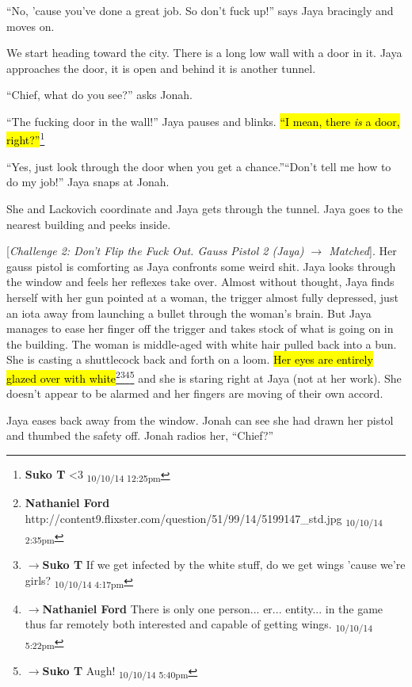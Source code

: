 ``No, 'cause you've done a great job.  So don't fuck up!'' says Jaya bracingly and moves on.





We start heading toward the city.  There is a long low wall with a door in it.  Jaya approaches the door, it is open and behind it is another tunnel.

``Chief, what do you see?'' asks Jonah.

``The fucking door in the wall!'' Jaya pauses and blinks.  \hl{``I mean, there \textit{is} a door, right?''}\footnote{\textbf{Suko T }\textless 3 \textsubscript{10/10/14 12:25pm}}

``Yes, just look through the door when you get a chance.''``Don't tell me how to do my job!'' Jaya snaps at Jonah.  

She and Lackovich coordinate and Jaya gets through the tunnel.  Jaya goes to the nearest building and peeks inside.

{[}\textit{Challenge 2: Don't Flip the Fuck Out.  Gauss Pistol 2 (Jaya) $\rightarrow$ Matched}{]}.   Her gauss pistol is comforting as Jaya confronts some weird shit.  Jaya looks through the window and feels her reflexes take over.  Almost without thought, Jaya finds herself with her gun pointed at a woman, the trigger almost fully depressed, just an iota away from launching a bullet through the woman's brain.  But Jaya manages to ease her finger off the trigger and takes stock of what is going on in the building.  The woman is middle-aged with white hair pulled back into a bun.  She is casting a shuttlecock back and forth on a loom.  \hl{Her eyes are entirely glazed over with white}\footnote{\textbf{Nathaniel Ford }http://content9.flixster.com/question/51/99/14/5199147\_std.jpg \textsubscript{10/10/14 2:35pm}}\footnote{$\rightarrow$\textbf{Suko T }If we get infected by the white stuff, do we get wings 'cause we're girls? \textsubscript{10/10/14 4:17pm}}\footnote{$\rightarrow$\textbf{Nathaniel Ford }There is only one person... er... entity... in the game thus far remotely both interested and capable of getting wings. \textsubscript{10/10/14 5:22pm}}\footnote{$\rightarrow$\textbf{Suko T }Augh!  \textsubscript{10/10/14 5:40pm}} and she is staring right at Jaya (not at her work).  She doesn't appear to be alarmed and her fingers are moving of their own accord.



Jaya eases back away from the window.  Jonah can see she had drawn her pistol and thumbed the safety off.  Jonah radios her, ``Chief?''

